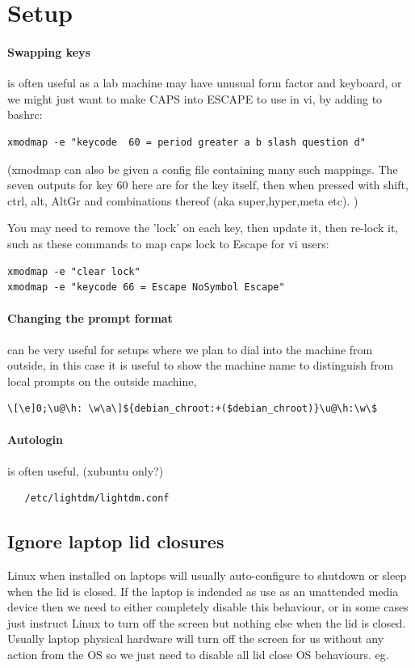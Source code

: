 \documentclass[oneside,english]{scrbook}
\begin{document}
\section{Setup}

\paragraph{Swapping keys} is often useful as a lab machine may have unusual form factor and keyboard, or we might just want to make CAPS into ESCAPE to use in vi, by adding to bashrc:

\begin{lstlisting}
xmodmap -e "keycode  60 = period greater a b slash question d"
\end{lstlisting}
(xmodmap can also be given a config file containing many such mappings.  The seven outputs for key 60 here are for the key itself, then when pressed with shift, ctrl, alt, AltGr and combinations thereof (aka super,hyper,meta etc). )

You may need to remove the 'lock' on each key, then update it, then re-lock it, such as these commands to map caps lock to Escape for vi users:

\begin{lstlisting}
xmodmap -e "clear lock"
xmodmap -e "keycode 66 = Escape NoSymbol Escape"
\end{lstlisting}


\paragraph{Changing the prompt format} can be very useful for setups where we plan to dial into the machine from outside, in this case it is useful to show the machine name to distinguish from local prompts on the outside machine,
\begin{lstlisting}
\[\e]0;\u@\h: \w\a\]${debian_chroot:+($debian_chroot)}\u@\h:\w\$
\end{lstlisting}

\paragraph{Autologin} is often useful, (xubuntu only?)
\begin{lstlisting}
   /etc/lightdm/lightdm.conf
\end{lstlisting}

\subsection{Ignore laptop lid closures}
Linux when installed on laptops will usually auto-configure to shutdown or sleep when the lid is closed.  If the laptop is indended as use as an unattended media device then we need to either completely disable this behaviour, or in some cases just instruct Linux to turn off the screen but nothing else when the lid is closed.  Usually laptop physical hardware will turn off the screen for us without any action from the OS so we just need to disable all lid close OS behaviours. eg.
\end{document}
